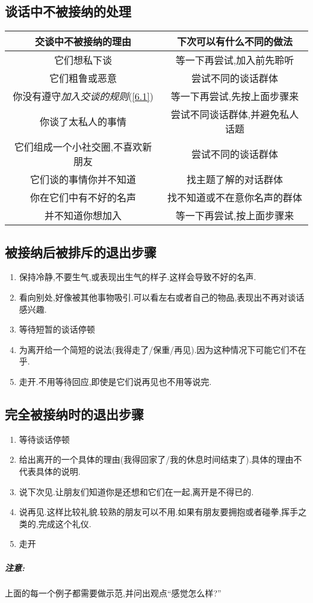 \documentclass[UTF8]{article}
\newcommand{\warn}{\subparagraph*{注意:}}
\begin{document}
\subsection{谈话中不被接纳的处理}
\begin{center}
\begin{tabular}{c|c}
    \textbf{交谈中不被接纳的理由}&\textbf{下次可以有什么不同的做法}\\ \hline
    它们想私下谈&等一下再尝试,加入前先聆听\\
    它们粗鲁或恶意&尝试不同的谈话群体\\
    你没有遵守\emph{加入交谈的规则}(\ref{6.1})&等一下再尝试,先按上面步骤来\\
    你谈了太私人的事情&尝试不同谈话群体,并避免私人话题\\
    它们组成一个小社交圈,不喜欢新朋友&尝试不同的谈话群体\\
    它们谈的事情你并不知道&找主题了解的对话群体\\
    你在它们中有不好的名声&找不知道或不在意你名声的群体\\
    并不知道你想加入&等一下再尝试,按上面步骤来\\
\end{tabular}
\end{center}
\subsection{被接纳后被排斥的退出步骤}
\begin{enumerate}
    \item 保持冷静,不要生气,或表现出生气的样子.这样会导致不好的名声.
    \item 看向别处,好像被其他事物吸引.可以看左右或者自己的物品,表现出不再对谈话感兴趣.
    \item 等待短暂的谈话停顿
    \item 为离开给一个简短的说法(我得走了/保重/再见).因为这种情况下可能它们不在乎.
    \item 走开.不用等待回应,即使是它们说再见也不用等说完.
\end{enumerate}
\subsection{完全被接纳时的退出步骤}
\begin{enumerate}
    \item 等待谈话停顿
    \item 给出离开的一个具体的理由(我得回家了/我的休息时间结束了).具体的理由不代表具体的说明.
    \item 说下次见.让朋友们知道你是还想和它们在一起,离开是不得已的.
    \item 说再见.这样比较礼貌.较熟的朋友可以不用.如果有朋友要拥抱或者碰拳,挥手之类的,完成这个礼仪.
    \item 走开
\end{enumerate}
\warn 上面的每一个例子都需要做示范,并问出观点``感觉怎么样?''
\end{document}
